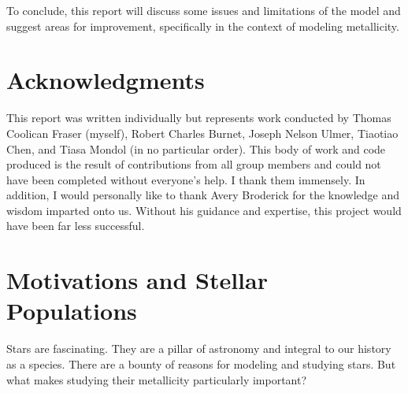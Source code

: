 \documentclass[11pt]{article}
\begin{document}
    To conclude, this report will discuss some issues and limitations of the model and suggest areas for improvement, specifically in the context of modeling metallicity.

    \section*{Acknowledgments}
    This report was written individually but represents work conducted by Thomas Coolican Fraser (myself), Robert Charles Burnet, Joseph Nelson Ulmer, Tiaotiao Chen, and Tiasa Mondol (in no particular order). This body of work and code produced is the result of contributions from all group members and could not have been completed without everyone's help. I thank them immensely. In addition, I would personally like to thank Avery Broderick for the knowledge and wisdom imparted onto us. Without his guidance and expertise, this project would have been far less successful.

    \section{Motivations and Stellar Populations}
    Stars are fascinating. They are a pillar of astronomy and integral to our history as a species. There are a bounty of reasons for modeling and studying stars. But what makes studying their metallicity particularly important?
\end{document}
